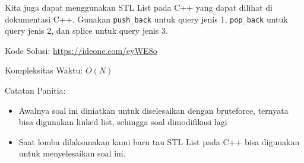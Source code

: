 Kita juga dapat menggunakan STL List pada C++ yang dapat dilihat di dokumentasi C++. Gunakan \lstinline|push_back| untuk query jenis 1, \lstinline|pop_back| untuk query jenis 2, dan splice untuk query jenis 3.

Kode Solusi: \url{https://ideone.com/eyWE8o}

Kompleksitas Waktu: $O(N)$

Catatan Panitia:

\begin{itemize}
    \item Awalnya soal ini diniatkan untuk diselesaikan dengan bruteforce, ternyata bisa digunakan linked list, sehingga soal dimodifikasi lagi
    \item Saat lomba dilaksanakan kami baru tau STL List pada C++ bisa digunakan untuk menyelesaikan soal ini.
\end{itemize}
